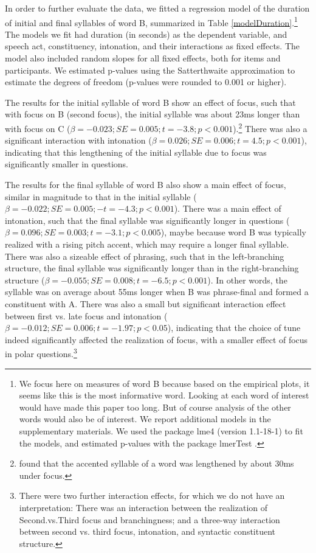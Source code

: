 \documentclass[preprint,review,12pt,authoryear,times]{elsarticle}
\begin{document}
In order to further evaluate the data, we fitted a regression model of the duration of initial and final syllables of word B, summarized in Table \ref{modelDuration}.\footnote{We focus here on measures of word B because based on the empirical plots, it seems like this is the most informative word. Looking at each word of interest would have made this paper too long. But of course analysis of the other words would also be of interest. We report additional models in the supplementary materials. We used the package lme4 (version 1.1-18-1) to fit the models, and estimated p-values with the package lmerTest \citep{kuzne13}.} The models we fit had duration (in seconds) as the dependent variable, and speech act, constituency, intonation, and their interactions as fixed effects. The model also included random slopes for all fixed effects, both for items and participants.  We estimated p-values using the Satterthwaite approximation to estimate the degrees of freedom \citep{kuzne13} (p-values were rounded to 0.001 or higher).



The results for the initial syllable of word B show an effect of focus, such that with focus on B (second focus), the initial syllable was about 23ms longer than with focus on C ($\beta=-0.023; SE=0.005; t=-3.8; p<0.001$).\footnote{\citet{eady86} found that the accented syllable of a word was lengthened by about  30ms under focus.}  There was also a significant interaction with intonation ($\beta=0.026; SE=0.006; t=4.5; p<0.001$), indicating that this lengthening of the initial syllable due to focus was significantly smaller in questions.  

The results for the final syllable of word B also show a main effect of focus, similar in magnitude to that in the initial syllable ($\beta=-0.022; SE=0.005;-   t=-4.3; p<0.001$). There was a main effect of intonation, such that the final syllable was significantly longer in questions ($\beta=0.096; SE=0.003; t=-3.1; p<0.005$), maybe because word B was typically realized with a rising pitch accent, which may require a longer final syllable. There was also a sizeable effect of phrasing, such that in the left-branching structure, the final syllable was significantly longer than in the right-branching structure ($\beta=-0.055; SE=0.008; t=-6.5; p<0.001$). In other words, the syllable was on average about 55ms longer when B was phrase-final and formed a constituent with A. There was also a small but significant interaction effect between first vs. late focus and intonation ($\beta=-0.012; SE=0.006; t=-1.97; p<0.05$), indicating that the choice of tune indeed significantly affected the realization of focus, with a smaller effect of focus in polar questions.\footnote{There were two further interaction effects, for which we do not have an interpretation: There was an interaction between the realization of Second.vs.Third focus and branchingness; and a three-way interaction between second vs. third focus, intonation, and syntactic constituent structure.}
\end{document}
